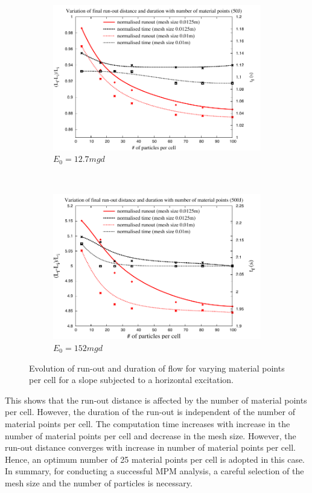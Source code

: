\begin{figure}[tbhp]
\centering
\begin{subfigure}[b]{0.9\textwidth}
\includegraphics[width=\textwidth]{50}
\caption{$E_0=12.7mgd$}
\label{fig:50}
\end{subfigure}
\\
\begin{subfigure}[b]{0.9\textwidth}
\centering
\includegraphics[width=\textwidth]{500}
\caption{$E_0=152mgd$}
\label{fig:500}
\end{subfigure}
\caption{Evolution of run-out and duration of flow  for varying material points 
per cell for a slope subjected to a horizontal excitation.}
\label{fig:MPM_Size_Effect}
\end{figure}

This shows that the run-out distance is affected by the number of material 
points per cell. However, the duration of the run-out is independent of the 
number of material points per cell. The computation time increases with 
increase in the number of material points per cell and decrease in the mesh 
size. However, the run-out distance converges with increase in number of 
material points per cell. Hence, an optimum number of 25 material points per 
cell is adopted in this case. In summary, for conducting a successful MPM 
analysis, a careful selection of the mesh size and the number of particles is 
necessary.


